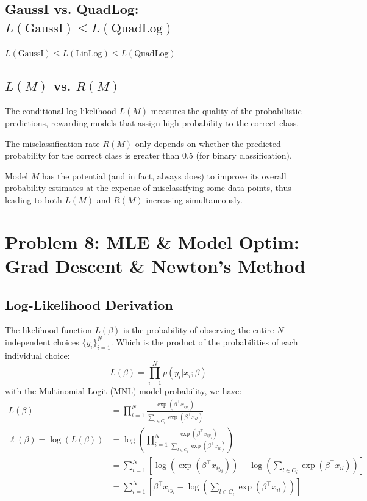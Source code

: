 \documentclass[11pt, a4paper, oneside]{memoir}
\begin{document}
\section[GaussI vs. QuadLog]{GaussI vs. QuadLog: $L(\text{GaussI}) \le L(\text{QuadLog})$}
$L(\text{GaussI}) \le L(\text{LinLog}) \le L(\text{QuadLog})$

\section[L(M) vs R(M)]{$L(M)$ vs. $R(M)$}
The conditional log-likelihood $L(M)$ measures the quality of the probabilistic predictions,
rewarding models that assign high probability to the correct class.

The misclassification rate $R(M)$ only depends on whether the predicted probability for the correct class is greater than 0.5 (for binary classification).

Model $M$ has the potential (and in fact, always does) to improve its overall probability estimates at the expense of misclassifying some data points,
thus leading to both $L(M)$ and $R(M)$ increasing simultaneously.

\chapter{Problem 8: MLE \& Model Optim: Grad Descent \& Newton's Method}
\section{Log-Likelihood Derivation}
The likelihood function $L(\beta)$ is the probability of observing the entire $N$ independent choices $\{y_i\}_{i=1}^N$.
Which is the product of the probabilities of each individual choice:
\[ L(\beta) = \prod_{i=1}^N p(y_i | x_i; \beta) \]
with the Multinomial Logit (MNL) model probability, we have:
\begin{align*}
  L(\beta) &= \prod_{i=1}^{N} \frac{\exp(\beta^\top x_{iy_i})}{\sum_{l \in C_i} \exp(\beta^\top x_{il})} \\
  \ell(\beta) = \log(L(\beta)) &= \log \left( \prod_{i=1}^{N} \frac{\exp(\beta^\top x_{iy_i})}{\sum_{l \in C_i} \exp(\beta^\top x_{il})} \right) \\
  &= \sum_{i=1}^{N} \left[ \log(\exp(\beta^\top x_{iy_i})) - \log \left( \sum_{l \in C_i} \exp(\beta^\top x_{il}) \right) \right] \\
  &= \sum_{i=1}^{N} \left[ \beta^\top x_{iy_i} - \log \left( \sum_{l \in C_i} \exp(\beta^\top x_{il}) \right) \right]
\end{align*}
\end{document}
